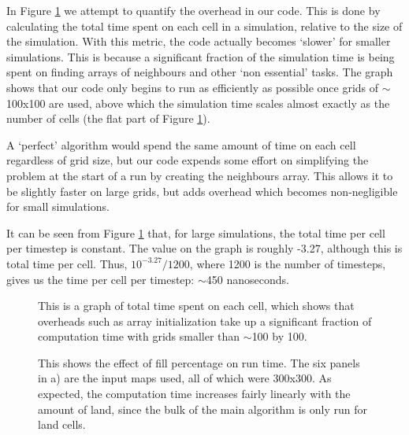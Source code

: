 	 In Figure \ref{overhead} we attempt to quantify the overhead in our code. This is done by calculating the total time spent on each cell in a 
	 simulation, relative to the size of the simulation. With this metric, the code actually becomes `slower' for smaller simulations. This is 
	 because a significant fraction of the simulation time is being spent on finding arrays of neighbours and other `non essential' tasks. The graph
	 shows that our code only begins to run as efficiently as possible once grids of $\sim$100x100 are used, above which the simulation time scales
	 almost exactly as the number of cells (the flat part of Figure \ref{overhead}).\newline{}
	 
	 A `perfect' algorithm would spend the same amount of time on each cell regardless of grid size, but our code expends some effort on simplifying the problem 
	 at the start of a run by creating the neighbours array. This allows it to be slightly faster on large grids, but adds overhead which becomes non-negligible 
	 for small simulations.\newline{}
	 
	 It can be seen from Figure \ref{overhead} that, for large simulations, the total time per cell per timestep is constant. The value on the 
	 graph is roughly -3.27, although this is total time per cell. Thus, $10^{-3.27}/1200$, where 1200 is the number of timesteps, gives us the 
	 time per cell per timestep: $\sim$450 nanoseconds.
	 
  \begin{figure}[H]
  \begin{center}
  
  \caption{\label{overhead}This is a graph of total time spent on each cell, which shows that overheads such as array initialization
  take up a significant fraction of computation time with grids smaller than $\sim$100 by 100.}
  \end{center}
  \end{figure}
  
  \begin{figure}[H]
  \begin{center}
  \subfloat[]{}
  \caption{\label{empty}This shows the effect of fill percentage on run time. The six panels in a) are the input maps used, all of which were
  300x300. As expected, the computation time increases fairly linearly with
  the amount of land, since the bulk of the main algorithm is only run for land cells.}
  \end{center}
  \end{figure}
  
  
